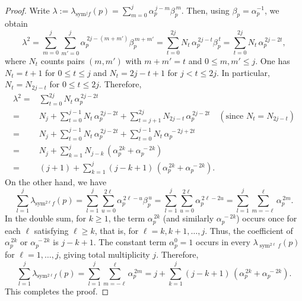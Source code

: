 \documentclass[10pt,a4paper]{amsart}
\begin{document}
\begin{proof}
Write $\lambda := \lambda_{\mathrm{sym}^{j}f}(p) = \sum_{m=0}^{j} \alpha_p^{\,j-m}\beta_p^{\,m}$.
Then, using $\beta_p = \alpha_p^{-1}$, we obtain
\[
\lambda^{2} = \sum_{m=0}^{j}\sum_{m'=0}^{j} \alpha_p^{\,2j-(m+m')}\beta_p^{\,m+m'}
      = \sum_{t=0}^{2j} N_t \, \alpha_p^{\,2j-t}\beta_p^{\,t}= \sum_{t=0}^{2j} N_t \, \alpha_p^{\,2j-2t},
\]
where $N_t$ counts pairs $(m,m')$ with $m+m'=t$ and $0\le m,m'\le j$.
One has $N_t = t+1$ for $0\le t\le j$ and $N_t = 2j-t+1$ for $j<t\le 2j$. In particular, $N_t = N_{2j-t}$ for $0\le t\le 2j$. Therefore, 
\begin{align}
    \lambda^{2} = &\sum_{t=0}^{2j} N_t \, \alpha_p^{\,2j-2t}\\
      =&N_{j}+ \sum_{t=0}^{j-1} N_t \, \alpha_p^{\,2j-2t}+ \sum_{t=j+1}^{2j} N_{2j-t} \, \alpha_p^{\,2j-2t}\quad (\text{since } N_t = N_{2j-t})\\
      =&N_{j}+ \sum_{t=0}^{j-1} N_t \, \alpha_p^{\,2j-2t}+ \sum_{t=0}^{j-1} N_{t} \, \alpha_p^{\,-2j+2t}\\
      =&N_{j}+ \sum_{k=1}^{j} N_{j-k} \, \left(\alpha_p^{\,2k}+\alpha_p^{\,-2k}\right)\\
      =& (j+1)+ \sum_{k=1}^{j} (j-k+1) \, \left(\alpha_p^{\,2k}+\alpha_p^{\,-2k}\right).
\end{align}
On the other hand, we have
\[
\sum_{l=1}^{j}\lambda_{\mathrm{sym}^{2\ell}f}(p) = \sum_{l=1}^{j}\sum_{u=0}^{2\ell} \alpha_p^{\,2\ell-u}\beta_p^{\,u}= \sum_{l=1}^{j}\sum_{u=0}^{2\ell} \alpha_p^{\,2\ell-2u} = \sum_{l=1}^{j}\sum_{m=-\ell}^{\ell} \alpha_p^{\,2m}.
\]
In the double sum, for \( k \geq 1 \), the term \( \alpha_p^{\,2k} \) (and similarly \( \alpha_p^{\,-2k} \)) occurs once for each \( \ell \) satisfying \( \ell \ge k \), that is, for \( \ell = k, k+1, \dots, j \). Thus, the coefficient of \( \alpha_p^{\,2k} \) or \( \alpha_p^{\,-2k} \) is \( j-k+1 \).
The constant term $\alpha_p^{0}=1$ occurs in every $\lambda_{\operatorname{sym}^{2\ell} f}(p)$ for $\ell = 1, \dots, j$, giving total multiplicity $j$. Therefore,
\[
\sum_{l=1}^{j}\lambda_{\mathrm{sym}^{2\ell}f}(p) = \sum_{l=1}^{j}\sum_{m=-\ell}^{\ell} \alpha_p^{\,2m}=j+ \sum_{k=1}^{j} (j-k+1) \, \left(\alpha_p^{\,2k}+\alpha_p^{\,-2k}\right).
\]This completes the proof.
\end{proof}
\end{document}
